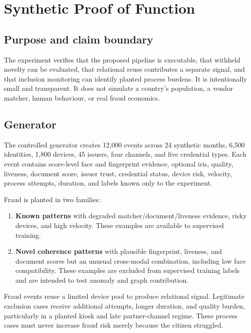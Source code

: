 \chapter{Synthetic Proof of Function}

\section{Purpose and claim boundary}

The experiment verifies that the proposed pipeline is executable, that withheld novelty can be evaluated, that relational reuse contributes a separate signal, and that inclusion monitoring can identify planted process burdens. It is intentionally small and transparent. It does not simulate a country's population, a vendor matcher, human behaviour, or real fraud economics.

\claimboundary

\section{Generator}

The controlled generator creates 12,000 events across 24 synthetic months, 6,500 identities, 1,800 devices, 45 issuers, four channels, and five credential types. Each event contains score-level face and fingerprint evidence, optional iris, quality, liveness, document score, issuer trust, credential status, device risk, velocity, process attempts, duration, and labels known only to the experiment.

Fraud is planted in two families:

\begin{enumerate}
\item \textbf{Known patterns} with degraded matcher/document/liveness evidence, risky devices, and high velocity. These examples are available to supervised training.
\item \textbf{Novel coherence patterns} with plausible fingerprint, liveness, and document scores but an unusual cross-modal combination, including low face compatibility. These examples are excluded from supervised training labels and are intended to test anomaly and graph contribution.
\end{enumerate}

Fraud events reuse a limited device pool to produce relational signal. Legitimate exclusion cases receive additional attempts, longer duration, and quality burden, particularly in a planted kiosk and late partner-channel regime. These process cases must never increase fraud risk merely because the citizen struggled.

